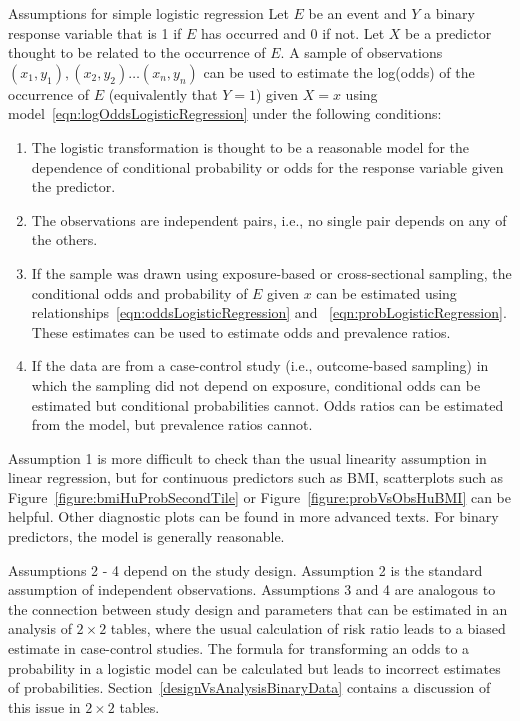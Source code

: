 \begin{onebox}{Assumptions for simple logistic regression} \label{box:logisticRegressionConditions}
  Let $E$ be an event and $Y$ a binary response variable that is 1 if $E$ has occurred and 0 if not. Let $X$ be a predictor thought to be related to the occurrence of $E$. A sample of observations $(x_1, y_1), (x_2, y_2)\ldots(x_n, y_n)$ can be used to estimate the log(odds) of the occurrence of $E$ (equivalently that $Y = 1$)  given $X = x$ using model~\ref{eqn:logOddsLogisticRegression} under the following conditions:

  \begin{enumerate}
      \item The logistic transformation is thought to be a reasonable model for the dependence of conditional probability or odds for the response variable given the predictor.
      \item The observations are independent pairs, i.e., no single pair depends on any of the others.
      \item If the sample was drawn using exposure-based or cross-sectional sampling, the conditional odds and probability of $E$ given $x$ can be estimated using relationships~\ref{eqn:oddsLogisticRegression} and ~\ref{eqn:probLogisticRegression}.  These estimates can be used to estimate odds and prevalence ratios.
      \item If the data are from a case-control study (i.e., outcome-based sampling) in which the sampling did not depend on exposure, conditional odds can be estimated but conditional probabilities cannot. Odds ratios can be estimated from the model, but prevalence ratios cannot.
  \end{enumerate}
\end{onebox}

Assumption 1 is more difficult to check than the usual linearity assumption in linear regression, but for continuous predictors such as BMI, scatterplots such as Figure~\ref{figure:bmiHuProbSecondTile} or Figure~\ref{figure:probVsObsHuBMI} can be helpful. Other diagnostic plots can be found in more advanced texts. For binary predictors, the model is generally reasonable.

Assumptions 2 - 4 depend on the study design. Assumption 2 is the standard assumption of independent observations.  Assumptions 3 and 4 are analogous to the connection between study design and parameters that can be estimated in an analysis of $2 \times 2$ tables, where the usual calculation of risk ratio leads to a biased estimate in case-control studies.  The formula for transforming an odds to a probability in a logistic model can be calculated but leads to incorrect estimates of probabilities.  Section~\ref{designVsAnalysisBinaryData} contains a discussion of this issue in $2 \times 2$ tables.

